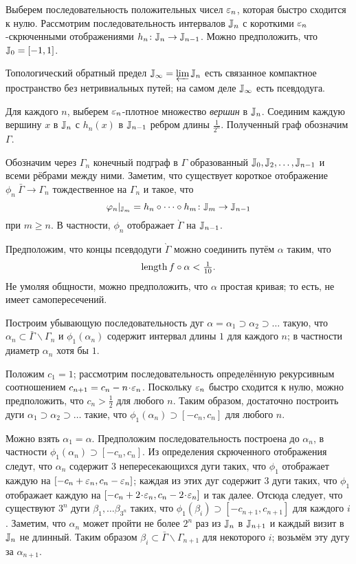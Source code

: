 \documentclass[oneside,a4paper]{article}
\begin{document}
Выберем последовательность положительных чисел $\varepsilon_n$, которая быстро  сходится к нулю.
Рассмотрим последовательность интервалов $\mathbb{J}_n$ с короткими $\varepsilon_n$-скрюченными отображениями $h_n\colon\mathbb{J}_{n}\to \mathbb{J}_{n-1}$.
Можно предположить, что $\mathbb{J}_0=[-1,1]$.

Топологический обратный предел $\mathbb{J}_\infty=\varprojlim \mathbb{J}_n$ есть связанное компактное пространство без нетривиальных путей; на самом деле $\mathbb{J}_\infty$ есть псевдодуга.

Для каждого $n$, выберем $\varepsilon_n$-плотное множество \emph{вершин} в $\mathbb{J}_n$.
Соединим каждую вершину $x$ в $\mathbb{J}_n$ с $h_n(x)$ в $\mathbb{J}_{n-1}$ ребром длины $\tfrac1{2^n}$.
Полученный граф обозначим $\Gamma$.

Обозначим через $\Gamma_n$ конечный подграф в $\Gamma$ образованный $\mathbb{J}_0,\mathbb{J}_2,\dots,\mathbb{J}_{n-1}$ и всеми рёбрами между ними.
Заметим, что существует короткое отображение $\phi_n\:\bar\Gamma\to\Gamma_{n}$ тождественное на $\Gamma_{n}$ и такое, что
\[\varphi_n|_{\mathbb{J}_m}=h_n\circ\dots\circ h_{m}\colon\mathbb{J}_m\to\mathbb{J}_{n-1}\] 
при $m\ge n$.
В частности, $\phi_n$ отображает $\grave\Gamma$ на $\mathbb{J}_{n-1}$.

Предположим, что концы псевдодуги $\grave\Gamma$ можно соединить путём $\alpha$ таким, что
\[\mathop{\rm length}\nolimits f\circ\alpha<\tfrac1{10}.\]
Не умоляя общности, можно предположить, что $\alpha$ простая кривая; то есть, не имеет самопересечений.

Построим убывающую последовательность дуг $\alpha=\alpha_1\supset \alpha_2\supset \dots$ такую, что $\alpha_n\subset \bar\Gamma\backslash\Gamma_n$ и $\phi_1(\alpha_n)$ содержит интервал длины $1$ для каждого $n$;
в частности диаметр $\alpha_n$ хотя бы $1$.

Положим $c_1=1$; 
рассмотрим последовательность определённую рекурсивным соотношением $c_{n+1}=c_n-n\cdot \eps_n$.
Поскольку $\varepsilon_n$ быстро сходится к нулю, можно предположить, что $c_n>\tfrac12$ для любого $n$.
Таким образом, достаточно построить дуги $\alpha_1\supset \alpha_2\supset \dots$ такие, что $\phi_1(\alpha_n)\supset [-c_n,c_n]$ для любого $n$.

Можно взять $\alpha_1=\alpha$.
Предположим последовательность построена до $\alpha_n$, в частности $\phi_1(\alpha_n)\supset [-c_n,c_n]$.
Из определения скрюченного отображения следут, что
$\alpha_n$ содержит $3$ непересекающихся дуги таких, что $\phi_1$ отображает каждую на $[-c_n+\varepsilon_n,c_n-\varepsilon_n]$;
каждая из этих дуг содержит $3$ дуги таких, что $\phi_1$ отображает каждую на  $[-c_n+2\cdot\eps_n,c_n-2\cdot \eps_n]$ и так далее.
Отсюда следует, что существуют $3^n$ дуги $\beta_1,\dots \beta_{3^n}$ таких, что $\phi_1(\beta_i)\supset [-c_{n+1},c_{n+1}]$ для каждого $i$.
Заметим, что $\alpha_n$ может пройти не более $2^n$ раз из $\mathbb{J}_n$ в $\mathbb{J}_{n+1}$
и каждый визит в $\mathbb{J}_n$ не длинный.
Таким образом $\beta_i\subset \bar\Gamma\backslash\Gamma_{n+1}$ для некоторого $i$; возьмём эту дугу за $\alpha_{n+1}$.
\end{document}
